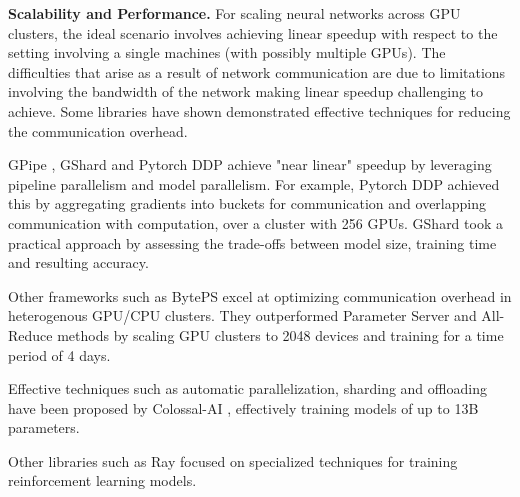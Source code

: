 \textbf{Scalability and Performance.}
For scaling neural networks across GPU clusters, the ideal scenario involves achieving linear speedup
with respect to the setting involving a single machines (with possibly multiple GPUs). The difficulties
that arise as a result of network communication are due to limitations involving the bandwidth of the
network making linear speedup challenging to achieve. Some libraries have shown demonstrated
effective techniques for reducing the communication overhead.

GPipe \cite{huang_gpipe_2019}, GShard \cite{lepikhin_gshard_2020} and Pytorch DDP
\cite{li_pytorch_2020} achieve "near linear" speedup by leveraging pipeline parallelism and model
parallelism. For example, Pytorch DDP achieved this by aggregating gradients into buckets for
communication and overlapping communication with computation, over a cluster with 256 GPUs. GShard
took a practical approach by assessing the trade-offs between model size, training time and
resulting accuracy.

Other frameworks such as BytePS \cite{jiang_unified_nodate} excel at optimizing communication
overhead in heterogenous GPU/CPU clusters. They outperformed Parameter Server and All-Reduce
methods by scaling GPU clusters to 2048 devices and training for a time period of 4 days.

Effective techniques such as automatic parallelization, sharding and offloading have been proposed
by Colossal-AI \cite{li_colossal-ai_2023}, effectively training models of up to 13B parameters.

Other libraries such as Ray \cite{moritz_ray_2018} focused on specialized techniques for training
reinforcement learning models.

